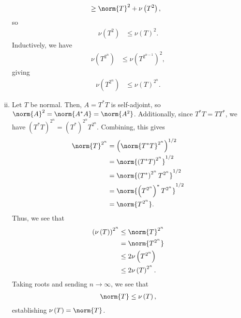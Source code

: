 \documentclass[10pt]{mypackage}
\begin{document}
\begin{solution}
\begin{enumerate}[(i)]
\begin{align*}
                                         &\geq \norm{T}^2 + \nu\left(T^2\right),
      \end{align*}
      so
      \begin{align*}
        \nu\left(T^2\right) &\leq \nu\left(T\right)^2.
      \end{align*}
      Inductively, we have
      \begin{align*}
        \nu\left(T^{2^n}\right) &\leq \nu\left(T^{2^{n-1}}\right)^2,
      \end{align*}
      giving
      \begin{align*}
        \nu\left(T^{2^{n}}\right) &\leq \nu\left(T\right)^{2^n}.
      \end{align*}
    \item Let $T$ be normal. Then, $A = T^{\ast}T$ is self-adjoint, so $\norm{A}^2 = \norm{A^{\ast}A} = \norm{A^2}$. Additionally, since $T^{\ast}T = TT^{\ast}$, we have $\left(T^{\ast}T\right)^{2^n} = \left(T^{\ast}\right)^{2^n}T^{2^n}$. Combining, this gives
      \begin{align*}
        \norm{T}^{2^n} &= \left(\norm{T^{\ast}T}^{2^n}\right)^{1/2}\\
                       &= \norm{\left(T^{\ast}T\right)^{2^n}}^{1/2}\\
                       &= \norm{\left(T^{\ast}\right)^{2^n}T^{2^n}}^{1/2}\\
                       &= \norm{\left(T^{2^n}\right)^{\ast}T^{2^n}}^{1/2}\\
                       &= \norm{T^{2^n}}.
      \end{align*}
      Thus, we see that
      \begin{align*}
        \left(\nu\left(T\right)\right)^{2^n} &\leq \norm{T}^{2^n}\\
                                             &= \norm{T^{2^n}}\\
                                             &\leq 2\nu\left(T^{2^n}\right)\\
                                             &\leq 2\nu\left(T\right)^{2^n}.
      \end{align*}
      Taking roots and sending $n\rightarrow\infty$, we see that
      \begin{align*}
        \norm{T}\leq \nu\left(T\right),
      \end{align*}
      establishing $\nu\left(T\right) = \norm{T}$.
  \end{enumerate}
\end{solution}
\end{document}
